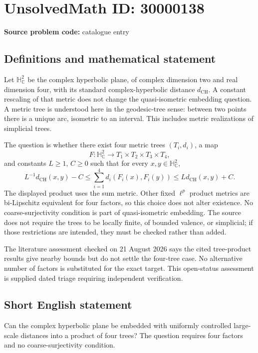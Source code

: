 \documentclass[11pt]{article}
\newcommand{\C}{\mathbb{C}}
\begin{document}
\section*{UnsolvedMath ID: 30000138}
\textbf{Source problem code:} catalogue entry
\subsection{Definitions and mathematical statement}
Let $\mathbb H^2_{\C}$ be the complex hyperbolic plane, of complex dimension two and real dimension four, with its standard complex-hyperbolic distance $d_{\mathrm{CH}}$. A constant rescaling of that metric does not change the quasi-isometric embedding question. A metric tree is understood here in the geodesic-tree sense: between two points there is a unique arc, isometric to an interval. This includes metric realizations of simplicial trees.

The question is whether there exist four metric trees $(T_i,d_i)$, a map
\[
 F:\mathbb H^2_{\C}\longrightarrow T_1\times T_2\times T_3\times T_4,
\]
and constants $L\ge1$, $C\ge0$ such that for every $x,y\in\mathbb H^2_{\C}$,
\[
 L^{-1}d_{\mathrm{CH}}(x,y)-C
 \le\sum_{i=1}^4d_i(F_i(x),F_i(y))
 \le Ld_{\mathrm{CH}}(x,y)+C.
\]
The displayed product uses the sum metric. Other fixed $\ell^p$ product metrics are bi-Lipschitz equivalent for four factors, so this choice does not alter existence. No coarse-surjectivity condition is part of quasi-isometric embedding. The source does not require the trees to be locally finite, of bounded valence, or simplicial; if those restrictions are intended, they must be checked rather than added.

The literature assessment checked on 21 August 2026 says the cited tree-product results give nearby bounds but do not settle the four-tree case. No alternative number of factors is substituted for the exact target. This open-status assessment is supplied dated triage requiring independent verification.
\subsection{Short English statement}
Can the complex hyperbolic plane be embedded with uniformly controlled large-scale distances into a product of four trees? The question requires four factors and no coarse-surjectivity condition.
\end{document}
